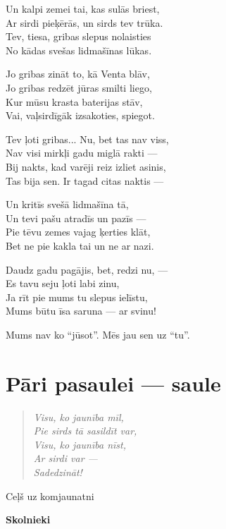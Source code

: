 \documentclass[14pt]{extarticle}
\begin{document}
{{Un kalpi zemei tai, kas sulās briest,\\
Ar sirdi pieķērās, un sirds tev trūka.\\
Tev, tiesa, gribas slepus nolaisties\\
No kādas svešas lidmašīnas lūkas.

Jo gribas zināt to, kā Venta blāv,\\
Jo gribas redzēt jūras smilti liego,\\
Kur mūsu krasta baterijas stāv,\\
Vai, vaļsirdīgāk izsakoties, spiegot. 

Tev ļoti gribas... Nu, bet tas nav viss,\\
Nav visi mirkļi gadu miglā rakti ---\\
Bij nakts, kad varēji reiz izliet asinis,\\
Tas bija sen. Ir tagad citas naktis ---

Un kritīs svešā lidmašīna tā,\\
Un tevi pašu atradīs un pazīs ---\\
Pie tēvu zemes vajag ķerties klāt,\\
Bet ne pie kakla tai un ne ar nazi. 

Daudz gadu pagājis, bet, redzi nu, ---\\
Es tavu seju ļoti labi zinu,\\
Ja rīt pie mums tu slepus ielīstu,\\
Mums būtu īsa saruna --- ar svinu!

Mums nav ko ``jūsot''. Mēs jau sen uz ``tu''.



\newpage

\section{Pāri pasaulei --- saule}

\begin{quote}
{\em
Visu, ko jaunība mīl,\\
Pie sirds tā sasildīt var,\\
Visu, ko jaunība nīst,\\
Ar sirdi var ---\\
Sadedzināt!
}
\end{quote}


{\large \sc Ceļš uz komjaunatni}

{\bf Skolnieki}

}}
\end{document}
